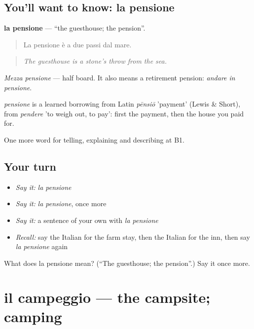 \subsection*{You'll want to know: la pensione}
\textbf{la pensione} — \textquotedblleft{}the guesthouse; the pension\textquotedblright{}.

\begin{quote}
La pensione è a due passi dal mare.
\end{quote}

\begin{quote}
\emph{The guesthouse is a stone's throw from the sea.}
\end{quote}

\emph{Mezza pensione} — half board. It also means a retirement pension: \emph{andare in pensione}.

\begin{cousinweb}
\emph{pensione} is a learned borrowing from Latin \emph{pēnsiō} 'payment' (Lewis \& Short), from \emph{pendere} 'to weigh out, to pay': first the payment, then the house you paid for.
\end{cousinweb}

\begin{grammarlens}[title={What you've built}]
One more word for telling, explaining and describing at B1.
\end{grammarlens}

\subsection*{Your turn}
\begin{itemize}
\raggedright
  \item \emph{Say it:} \emph{la pensione}
  \item \emph{Say it:} \emph{la pensione}, once more
  \item \emph{Say it:} a sentence of your own with \emph{la pensione}
  \item \emph{Recall:} say the Italian for the farm stay, then the Italian for the inn, then say \emph{la pensione} again
\end{itemize}

\begin{tcolorbox}[breakable,colback=teal!4,colframe=teal!35!black,title={Before you move on}]
What does la pensione mean? (\textquotedblleft{}The guesthouse; the pension\textquotedblright{}.) Say it once more.
\end{tcolorbox}
\section[il campeggio]{il campeggio — the campsite; camping}

